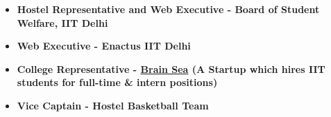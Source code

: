 

\begin{cvparagraph}

\begin{itemize}
  \item \textbf{Hostel Representative and Web Executive - Board of Student Welfare, IIT Delhi}
  \item \textbf{Web Executive - Enactus IIT Delhi}
  \item\textbf{College Representative - \href{http://brainsea.in/}{Brain Sea} (A Startup which hires IIT students for full-time \& intern positions)}
  \item\textbf{Vice Captain - Hostel Basketball Team}
\end{itemize}

\end{cvparagraph}

